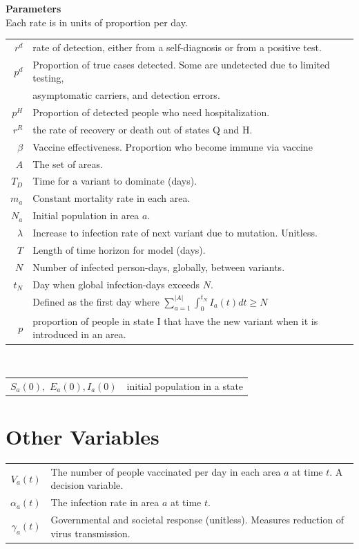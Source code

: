 \documentclass{article}
\begin{document}
\textbf{Parameters}\\
Each rate is in units of proportion per day.\\
\begin{tabular}{rl}
$r^d$ &rate of detection, either from a self-diagnosis or from a positive test.\\ %
$p^d$ &Proportion of true cases detected. Some are undetected due to limited testing,\\ &asymptomatic carriers, and detection errors.\\ %
$p^H$ &Proportion of detected people who need hospitalization.\\ %
$r^R$ &the rate of recovery or death out of states Q and H. \\
$\beta$ & Vaccine effectiveness. Proportion who become immune via vaccine\\
$A$ &The set of areas.\\
$T_D$  &Time for a variant to dominate (days).\\
$m_a$ &Constant mortality rate in each area.\\
$N_a$ &Initial population in area $a$.\\
$\lambda$ & Increase to infection rate of next variant due to mutation. Unitless.\\
$T$ &Length of time horizon for model (days).\\
$N$ &Number of infected person-days, globally, between variants.\\
$t_N$ &Day when global infection-days exceeds $N$. \\
& Defined as the first day where $\displaystyle \sum_{a=1}^{|A|} \int_0^{t_N} I_a(t) dt \geq N$\\
$p$ &proportion of people in state I that have the new variant when it is introduced in an area.
\end{tabular}\\
\begin{tabular}{rl}
$S_a(0),$ $E_a(0), I_a(0)$ &initial population in a state
\end{tabular}
\section{Other Variables}
\begin{tabular}{rl}
    $V_a(t)$ &The number of people vaccinated per day in each area $a$ at time $t$. A decision variable.\\
    $\alpha_a(t)$ &The infection rate in area $a$ at time $t$.\\
    $\gamma_a(t)$ & Governmental and societal response (unitless). Measures reduction of virus transmission.
\end{tabular}
\end{document}
